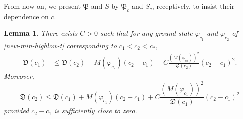 \documentclass[10pt]{article}
\newcommand{\norm}[1]{\left\|   #1   \right\|}
\newcommand{\paar}[1]{\left( #1 \right)}
\newcommand{\fd}{\mathfrak{D}}
\newcommand{\fp}{\mathfrak{P}}
\numberwithin{equation}{section}
\newtheorem{lemma}[theorem]{\quad Lemma}
\newcommand{\ff}{\varphi}
\newcommand{\al}{\alpha}
\begin{document}
	From now on, we   present $\fp$ and $S$ by $\fp_c$ and $S_c$, receptively, to insist their dependence on $c$.
	\begin{lemma}
		There exists $C>0$ such that for any ground state  $\ff_{c_1}$ and $\ff_{c_2}$ of \eqref{new-min-highlow-t} corresponding to $c_1<c_2<c_\ast$,
		\begin{equation}\label{left}
			\begin{split}
				\fd(c_1)&\leq\fd(c_2)-M(\ff_{c_2})(c_2-c_1)+C\frac{\paar{M(\ff_{c_2})}^2}{\fd(c_2)}(c_2-c_1)^2.
			\end{split}
		\end{equation}
		Moreover,
		\begin{equation}\label{right}
			\fd(c_2) \leq\fd(c_1)+M(\ff_{c_1})(c_2-c_1)+C\frac{\paar{M(\ff_{c_1})}^2}{\fd(c_1)}(c_2-c_1)^2 
		\end{equation}
		provided $c_2-c_1$ is sufficiently close to zero.
	\end{lemma}
\end{document}
